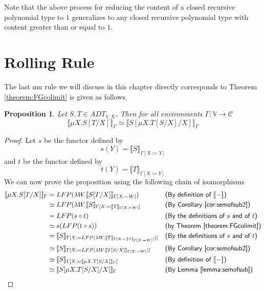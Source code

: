 \documentclass{msthesis}
\newtheorem{prop}[theorem]{Proposition}
\theoremstyle{definition}
\newcommand{\semof}[1]{\llbracket{#1}\rrbracket}
\newcommand{\mcC}{\mathcal{C}}
\newcommand{\vars}{\mathbb{V}}
\begin{document}
Note that the above process for reducing the content of a closed recursive polynomial type to $1$ generalizes to any closed recursive polynomial type with content greater than or equal to $1$.

\section{Rolling Rule}

The last mu rule we will discuss in this chapter directly corresponds to Theorem \ref{theorem:FGcolimit} is given as follows.  

\begin{prop}\label{prop:adtrolling}
Let $S,T \in ADT_{\vars, X}$.  Then for all environments $\Gamma : \vars \to \mcC$
\[ \semof{\mu X.S[T/X]}_\Gamma \simeq \semof{S[\mu X.T[S/X]/X]}_\Gamma \]
\end{prop}
\begin{proof}
    Let $s$ be the functor defined by
    \[ s(Y) = \semof{S}_{\Gamma[X:= Y]}\]
    and $t$ be the functor defined by
    \[ t(Y) = \semof{T}_{\Gamma[X:= Y]}\]
    We can now prove the proposition using the following chain of isomorphisms
    \begin{align*}
        \semof{\mu X.S[T/X]}_\Gamma 
        &= LFP(\lambda W. \semof{S[T/X]}_{\Gamma[X := W]}) && \textsf{(By definition of $\semof{-}$)}\\
        &\simeq LFP(\lambda W. \semof{S}_{\Gamma[X:= \semof{T}_{\Gamma[X:= W]}]} && \textsf{(By Corollary \ref{cor:semofsub2})} \\
        &= LFP(s \circ t)  && \textsf{(By the definitions of $s$ and of $t$)} \\
        &\simeq s(LFP(t \circ s)) && \textsf{(by Theorem \ref{theorem:FGcolimit})} \\
        &= \semof{S}_{\Gamma[X := LFP(\lambda W.\semof{T}_{\Gamma[X:= \semof{S}_{\Gamma[X := W]}]})]} && \textsf{(By the definitions of $s$ and of $t$)} \\
        &\simeq \semof{S}_{\Gamma[X := LFP(\lambda W.\semof{T[S/X]}_{\Gamma[X := W]})]} && \textsf{(By Corollary \ref{cor:semofsub2})} \\
        &\simeq \semof{S}_{\Gamma[X := \semof{\mu X.T[S/X]}_{\Gamma}]} && \textsf{(By definition of $\semof{-}$)} \\
        &\simeq \semof{S[\mu X.T[S/X]/X]}_\Gamma && \textsf{(By Lemma \ref{lemma:semofsub})} 
    \end{align*}\qedhere
\end{proof}
\end{document}
